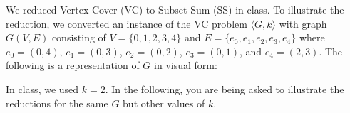\documentclass[12pt]{exam}
\newcommand{\stars}[1]{%
    \foreach \n in {1,...,#1}{%
        $\filledstar$%
    }%
}
\begin{document}
\begin{questions}
    \clearpage

    \question[20][W13, \stars{2}] We reduced Vertex Cover (VC) to Subset Sum (SS) in class. To illustrate the reduction, we converted
    an instance of the VC problem $\langle{G,k}\rangle$ with graph $G(V,E)$ consisting of $V = \{0,1,2,3,4\}$ and $E = \{e_0, e_1, e_2, e_3, e_4\}$
    where $e_0= (0,4)$, $e_1 = (0,3)$, $e_2 =(0,2)$, $e_3 = (0,1)$, and $e_4 = (2,3)$. The following is a representation of $G$ in visual form:


    In class, we used $k = 2$. In the following, you are being asked to illustrate the reductions for the same
    $G$ but other values of $k$.

\end{questions}
\end{document}

